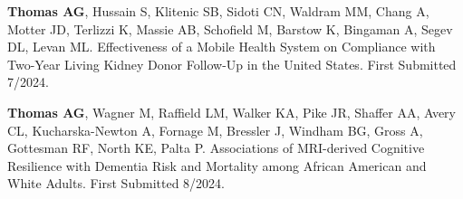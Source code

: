 \documentclass[10pt]{article}
\renewcommand{\section}[1]{\pagebreak[3]%
    \vspace{1.3\baselineskip}%
    \phantomsection\addcontentsline{toc}{section}{#1}%
    \noindent\llap{\scshape\smash{\parbox[t]{\marginparwidth}{\hyphenpenalty=10000\raggedright #1}}}%
    \vspace{-\baselineskip}\par}
\begin{document}
\begin{bibenum}

\item \textbf{Thomas AG}, Hussain S, Klitenic SB, Sidoti CN, Waldram MM,
  Chang A, Motter JD, Terlizzi K, Massie AB, Schofield M, Barstow K,
  Bingaman A, Segev DL, Levan ML. 
  Effectiveness of a Mobile Health System on Compliance with 
  Two-Year Living Kidney Donor Follow-Up in the United States.
  First Submitted 7/2024.

\item \textbf{Thomas AG}, Wagner M, Raffield LM, Walker KA, Pike JR,
  Shaffer AA, Avery CL, Kucharska-Newton A, Fornage M, Bressler J,
  Windham BG, Gross A, Gottesman RF, North KE, Palta P.
  Associations of MRI-derived Cognitive Resilience with 
  Dementia Risk and Mortality among African American and White Adults.
  First Submitted 8/2024.

\end{bibenum}








\end{document}
